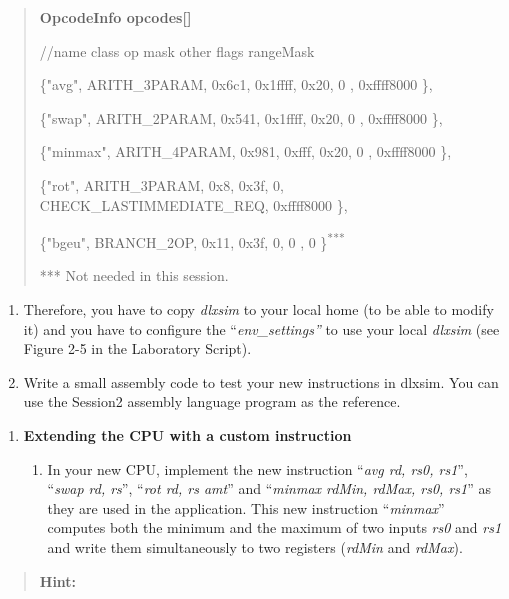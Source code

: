 \documentclass[
]{article}
\begin{document}
\begin{quote}
\textbf{OpcodeInfo opcodes{[}{]}}

//name class op mask other flags rangeMask

\{"avg", ARITH\_3PARAM, 0x6c1, 0x1ffff, 0x20, 0 , 0xffff8000 \},

\{"swap", ARITH\_2PARAM, 0x541, 0x1ffff, 0x20, 0 , 0xffff8000 \},

\{"minmax", ARITH\_4PARAM, 0x981, 0xfff, 0x20, 0 , 0xffff8000 \},

\{"rot", ARITH\_3PARAM, 0x8, 0x3f, 0,
CHECK\_LAST\textbar IMMEDIATE\_REQ, 0xffff8000 \},

\{"bgeu", BRANCH\_2OP, 0x11, 0x3f, 0, 0 , 0 \}\textsuperscript{***}

*** Not needed in this session.
\end{quote}

\begin{enumerate}
\def\labelenumi{\arabic{enumi}.}
\setcounter{enumi}{7}
\item
  Therefore, you have to copy \emph{dlxsim} to your local home (to be
  able to modify it) and you have to configure the
  ``\emph{env\_settings''} to use your local \emph{dlxsim} (see Figure
  2-5 in the Laboratory Script).
\item
  Write a small assembly code to test your new instructions in dlxsim.
  You can use the Session2 assembly language program as the reference.
\end{enumerate}

\begin{enumerate}
\def\labelenumi{\arabic{enumi}.}
\setcounter{enumi}{3}
\item
  \textbf{Extending the CPU with a custom instruction}

  \begin{enumerate}
  \def\labelenumii{\arabic{enumii}.}
  \item
    In your new CPU, implement the new instruction ``\emph{avg rd, rs0,
    rs1}'', ``\emph{swap rd, rs}'', ``\emph{rot rd, rs amt}'' and
    ``\emph{minmax rdMin, rdMax, rs0, rs1}'' as they are used in the
    application. This new instruction ``\emph{minmax}'' computes both
    the minimum and the maximum of two inputs \emph{rs0} and \emph{rs1}
    and write them simultaneously to two registers (\emph{rdMin} and
    \emph{rdMax}).
  \end{enumerate}
\end{enumerate}

\begin{quote}
\textbf{Hint:}
\end{quote}
\end{document}

